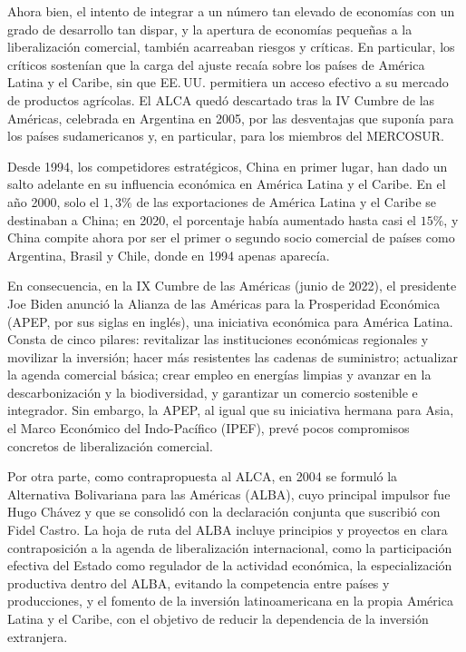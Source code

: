 \documentclass[10pt,a4paper]{article}
\begin{document}
Ahora bien, el intento de integrar a un número tan elevado de economías con un grado de desarrollo tan dispar, y la apertura de economías pequeñas a la liberalización comercial, también acarreaban riesgos y críticas. En particular, los críticos sostenían que la carga del ajuste recaía sobre los países de América Latina y el Caribe, sin que EE.\,UU. permitiera un acceso efectivo a su mercado de productos agrícolas. El ALCA quedó descartado tras la IV Cumbre de las Américas, celebrada en Argentina en 2005, por las desventajas que suponía para los países sudamericanos y, en particular, para los miembros del MERCOSUR.

Desde 1994, los competidores estratégicos, China en primer lugar, han dado un salto adelante en su influencia económica en América Latina y el Caribe. En el año 2000, solo el $1,3\%$ de las exportaciones de América Latina y el Caribe se destinaban a China; en 2020, el porcentaje había aumentado hasta casi el $15\%$, y China compite ahora por ser el primer o segundo socio comercial de países como Argentina, Brasil y Chile, donde en 1994 apenas aparecía.

En consecuencia, en la IX Cumbre de las Américas (junio de 2022), el presidente Joe Biden anunció la Alianza de las Américas para la Prosperidad Económica (APEP, por sus siglas en inglés), una iniciativa económica para América Latina. Consta de cinco pilares: revitalizar las instituciones económicas regionales y movilizar la inversión; hacer más resistentes las cadenas de suministro; actualizar la agenda comercial básica; crear empleo en energías limpias y avanzar en la descarbonización y la biodiversidad, y garantizar un comercio sostenible e integrador. Sin embargo, la APEP, al igual que su iniciativa hermana para Asia, el Marco Económico del Indo-Pacífico (IPEF), prevé pocos compromisos concretos de liberalización comercial.

Por otra parte, como contrapropuesta al ALCA, en 2004 se formuló la Alternativa Bolivariana para las Américas (ALBA), cuyo principal impulsor fue Hugo Chávez y que se consolidó con la declaración conjunta que suscribió con Fidel Castro. La hoja de ruta del ALBA incluye principios y proyectos en clara contraposición a la agenda de liberalización internacional, como la participación efectiva del Estado como regulador de la actividad económica, la especialización productiva dentro del ALBA, evitando la competencia entre países y producciones, y el fomento de la inversión latinoamericana en la propia América Latina y el Caribe, con el objetivo de reducir la dependencia de la inversión extranjera.
\end{document}
